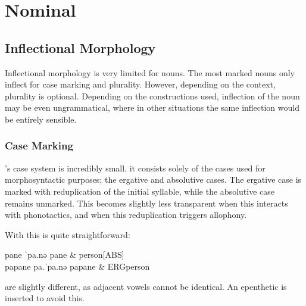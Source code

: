 \chapter{Nominal}\label{ch:morpho-nom}
\section{Inflectional Morphology}\label{sec:morpho-nom-inf}
Inflectional morphology is very limited for nouns. The most marked nouns only inflect for case marking and plurality. However, depending on the context, plurality is optional. Depending on the constructions used, inflection of the noun may be even ungrammatical, where in other situations the same inflection would be entirely sensible.

\subsection{Case Marking}\label{sec:case-marking}
\langname 's case system is incredibly small. it consists solely of the cases used for morphosyntactic purposes; the ergative and absolutive cases. The ergative case is marked with reduplication of the initial syllable, while the absolutive case remains unmarked. This becomes slightly less transparent when this interacts with phonotactics, and when this reduplication triggers allophony.


With  this is quite straightforward:

\begin{subexamples}
  \ex
    \preamble pane
    \pronunciation ˈpa.nə
    \gloss
      pane & person[ABS] \\
  \ex
    \preamble papane
    \pronunciation pa.ˈpa.nə
    \gloss
      pa\allo pane & ERG\allo person \\
\end{subexamples}

 are slightly different, as adjacent vowels cannot be identical. An epenthetic  is inserted to avoid this.

